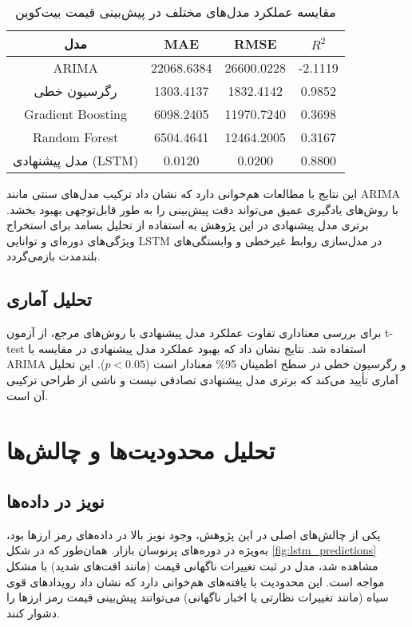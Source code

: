 \begin{table}[H]
	\centering
	\begin{tabular}{|c|c|c|c|}
		\hline
		\textbf{مدل} & \textbf{MAE} & \textbf{RMSE} & \textbf{ \(R^2\) } \\
		\hline
		ARIMA & 22068.6384 & 26600.0228 & -2.1119 \\
		رگرسیون خطی & 1303.4137 & 1832.4142 & 0.9852 \\
		Gradient Boosting & 6098.2405 & 11970.7240 & 0.3698 \\
		Random Forest & 6504.4641 & 12464.2005 & 0.3167 \\
		مدل پیشنهادی (LSTM) & 0.0120 & 0.0200 & 0.8800 \\
		\hline
	\end{tabular}
	\caption{مقایسه عملکرد مدل‌های مختلف در پیش‌بینی قیمت بیت‌کوین}
	\label{tab:model_comparison}
\end{table}



این نتایج با مطالعات \cite{zhang2005forecasting} هم‌خوانی دارد که نشان داد ترکیب مدل‌های سنتی مانند ARIMA با روش‌های یادگیری عمیق می‌تواند دقت پیش‌بینی را به طور قابل‌توجهی بهبود بخشد. برتری مدل پیشنهادی در این پژوهش به استفاده از تحلیل بسامد برای استخراج ویژگی‌های دوره‌ای و توانایی LSTM در مدل‌سازی روابط غیرخطی و وابستگی‌های بلندمدت بازمی‌گردد.



\subsection{تحلیل آماری}
برای بررسی معناداری تفاوت عملکرد مدل پیشنهادی با روش‌های مرجع، از آزمون t-test استفاده شد. نتایج نشان داد که بهبود عملکرد مدل پیشنهادی در مقایسه با ARIMA و رگرسیون خطی در سطح اطمینان 95\% معنادار است (\(p < 0.05\)). این تحلیل آماری تأیید می‌کند که برتری مدل پیشنهادی تصادفی نیست و ناشی از طراحی ترکیبی آن است.

\section{تحلیل محدودیت‌ها و چالش‌ها}
\label{sec:limitations}

\subsection{نویز در داده‌ها}
یکی از چالش‌های اصلی در این پژوهش، وجود نویز بالا در داده‌های رمز ارزها بود، به‌ویژه در دوره‌های پرنوسان بازار. همان‌طور که در شکل \ref{fig:lstm_predictions} مشاهده شد، مدل در ثبت تغییرات ناگهانی قیمت (مانند افت‌های شدید) با مشکل مواجه است. این محدودیت با یافته‌های \cite{fry2018market} هم‌خوانی دارد که نشان داد رویدادهای قوی سیاه (مانند تغییرات نظارتی یا اخبار ناگهانی) می‌توانند پیش‌بینی قیمت رمز ارزها را دشوار کنند.


